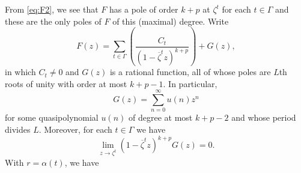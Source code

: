 \documentclass[10pt,reqno]{amsart}
\newcommand{\0}{\color{lightgray}0}
\renewcommand\>{\rangle}
\newcommand\<{\langle}
\theoremstyle{plain}
\theoremstyle{definition}
\begin{document}
From \eqref{eq:F2}, we see that $F$
has a pole of order $k+p$ at $\zeta^t$ for each $t \in \Gamma$
and these are the only poles of $F$ of this (maximal) degree.
Write
\begin{equation}\label{eq:Fcg}
F(z) = \sum_{t \in \Gamma}\left( \frac{C_t}{(1 - \overline{\zeta}^t z)^{k+p}} \right)+ G(z),
\end{equation}
in which $C_t \neq 0$ and $G(z)$ is a rational function, all of whose poles are
$L$th roots of unity with order at most $k + p - 1$.  In particular,
\begin{equation*}
G(z) = \sum_{n=0}^\infty u(n) z^n
\end{equation*}
for some quasipolynomial $u(n)$ of degree at most $k + p - 2$ and whose period divides $L$.   Moreover, for each $t \in \Gamma$ we have
\begin{equation*}
\lim_{z \to \zeta^t} (1 - \overline{\zeta}^t z)^{k+p} G(z) = 0.
\end{equation*}
With $r = \alpha(t)$, we have
\end{document}
